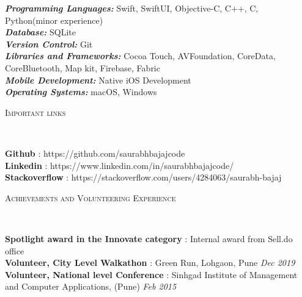 \documentclass[9pt]{article}
\newenvironment{changemargin}[2]{%
  \begin{list}{}{%
    \setlength{\topsep}{0pt}%
    \setlength{\leftmargin}{#1}%
    \setlength{\rightmargin}{#2}%
    \setlength{\listparindent}{\parindent}%
    \setlength{\itemindent}{\parindent}%
    \setlength{\parsep}{\parskip}%
  }%
  \item[]}{\end{list}
}
\newcommand{\lineover}{
    \begin{changemargin}{-0.05in}{-0.05in}
        \vspace*{-8pt}
        \hrulefill \\
        \vspace*{-2pt}
    \end{changemargin}
}
\newcommand{\header}[1]{
    \begin{changemargin}{-0.5in}{-0.5in}
        \scshape{#1}\\
    \lineover
    \end{changemargin}
}
\newenvironment{body} {
    \vspace*{-16pt}
    \begin{changemargin}{-0.25in}{-0.5in}
  }
    {\end{changemargin}
}
\begin{document}
\begin{body}
    \vspace{14pt}
    \emph{\textbf{Programming Languages:}}{} Swift, SwiftUI, Objective-C, C++, C, Python(minor experience)\\
    \vspace*{2pt}
    \emph{\textbf{Database:}}{} SQLite\\
    \vspace*{2pt}
    \emph{\textbf{Version Control:}}{} Git\\
    \vspace*{2pt}
    \emph{\textbf{Libraries and Frameworks:}}{} Cocoa Touch, AVFoundation, CoreData, CoreBluetooth, Map kit,
Firebase, Fabric \\
\vspace*{2pt}
    \emph{\textbf{Mobile Development:}}{} Native iOS Development \\
    \vspace*{2pt}
    \emph{\textbf{Operating Systems:}}{} macOS, Windows\\
\end{body}

\smallskip
\smallskip
\smallskip
\smallskip


\header{Important links}

\begin{body}
    \vspace{14pt}
    \textbf{Github} : https://github.com/saurabhbajajcode \hfill{}\\
    \smallskip
    \textbf{Linkedin} : https://www.linkedin.com/in/saurabhbajajcode/ \hfill{}\\
    \smallskip
    \textbf{Stackoverflow} : https://stackoverflow.com/users/4284063/saurabh-bajaj \hfill{}\\
\end{body}

\smallskip

\header{Achievements and Volunteering Experience}

\begin{body}
    \vspace{14pt}
    \textbf{Spotlight award in the Innovate category} : Internal award from Sell.do office\\
    \smallskip
    \textbf{Volunteer, City Level Walkathon} : Green Run, Lohgaon, Pune \hfill{} \emph{Dec 2019}\\
    \smallskip
    \textbf{Volunteer, National level Conference} : Sinhgad Institute of Management and Computer Applications, (Pune) \hfill {} \emph{Feb 2015}\\
\end{body}
\end{document}

